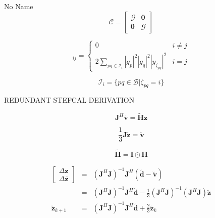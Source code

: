 \documentclass[a4paper,10pt]{article}
\newcommand{\conj}[1]{\overline{#1}}
\begin{document}
\begin{section}{No Name}
\begin{equation}
\boldsymbol{\mathcal{C}} =
\begin{bmatrix}
\boldsymbol{\mathcal{G}} & \boldsymbol{0}\\
\boldsymbol{0} & \boldsymbol{\mathcal{G}}
\end{bmatrix}
\end{equation}

\begin{equation}
 [\boldsymbol{\mathcal{G}}]_{ij} = 
\begin{cases}
0 & i\neq j\\
2\sum_{pq\in\mathcal{I}_{i}} |g_p|^2|g_q|^2|y_{\zeta_{pq}}|^2 & i=j
\end{cases}
\end{equation}

\begin{equation}
\mathcal{I}_i = \{pq\in\mathcal{B}|\zeta_{pq}=i\} 
\end{equation}

REDUNDANT STEFCAL DERIVATION

\begin{equation}
\boldsymbol{J}^H\breve{\boldsymbol{v}} = \widetilde{\boldsymbol{H}}\breve{\boldsymbol{z}} 
\end{equation}

\begin{equation}
\frac{1}{3} \boldsymbol{J}\breve{\boldsymbol{z}} = \breve{\boldsymbol{v}}
\end{equation}

\begin{equation}
\widetilde{\boldsymbol{H}} = \boldsymbol{I}\odot\boldsymbol{H} 
\end{equation}

\begin{eqnarray}
\begin{bmatrix} \Delta \boldsymbol{z}\\ \Delta \conj{\boldsymbol{z}} \end{bmatrix} &=& (\boldsymbol{J}^H\boldsymbol{J})^{-1} \boldsymbol{J}^H(\breve{\boldsymbol{d}}-\breve{\boldsymbol{v}})\\
&=& (\boldsymbol{J}^H\boldsymbol{J})^{-1}\boldsymbol{J}^H\breve{\boldsymbol{d}} - \frac{1}{3}(\boldsymbol{J}^H\boldsymbol{J})^{-1}(\boldsymbol{J}^H\boldsymbol{J})\breve{\boldsymbol{z}}\\
\breve{\boldsymbol{z}}_{k+1} &=& (\boldsymbol{J}^H\boldsymbol{J})^{-1}\boldsymbol{J}^H\breve{\boldsymbol{d}} + \frac{2}{3}\breve{\boldsymbol{z}}_k  
\end{eqnarray}


\end{section}
\end{document}
